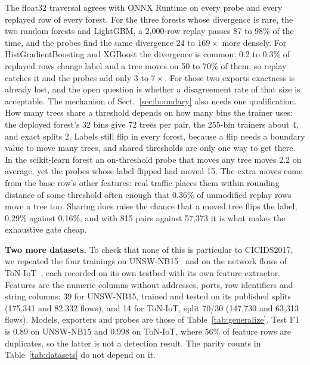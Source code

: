 \documentclass[runningheads]{llncs}
\begin{document}
The float32 traversal agrees with ONNX Runtime on every probe and every replayed row of every forest. For the three forests whose divergence is rare, the two random forests and LightGBM, a 2{,}000-row replay passes 87 to 98\% of the time, and the probes find the same divergence 24 to $169\times$ more densely. For HistGradientBoosting and XGBoost the divergence is common: 0.2 to 0.3\% of replayed rows change label and a tree moves on 50 to 70\% of them, so replay catches it and the probes add only 3 to $7\times$. For those two exports exactness is already lost, and the open question is whether a disagreement rate of that size is acceptable. The mechanism of Sect.~\ref{sec:boundary} also needs one qualification. How many trees share a threshold depends on how many bins the trainer uses: the deployed forest's 32 bins give 72 trees per pair, the 255-bin trainers about 4, and exact splits 2. Labels still flip in every forest, because a flip needs a boundary value to move many trees, and shared thresholds are only one way to get there. In the scikit-learn forest an on-threshold probe that moves any tree moves 2.2 on average, yet the probes whose label flipped had moved 15. The extra moves come from the base row's other features: real traffic places them within rounding distance of some threshold often enough that 0.36\% of unmodified replay rows move a tree too. Sharing does raise the chance that a moved tree flips the label, 0.29\% against 0.16\%, and with 815 pairs against 57{,}373 it is what makes the exhaustive gate cheap.

\textbf{Two more datasets.} To check that none of this is particular to CICIDS2017, we repeated the four trainings on UNSW-NB15~\cite{moustafa2015unsw} and on the network flows of ToN-IoT~\cite{moustafa2021toniot}, each recorded on its own testbed with its own feature extractor. Features are the numeric columns without addresses, ports, row identifiers and string columns: 39 for UNSW-NB15, trained and tested on its published splits (175{,}341 and 82{,}332 flows), and 14 for ToN-IoT, split 70/30 (147{,}730 and 63{,}313 flows). Models, exporters and probes are those of Table~\ref{tab:generalize}. Test F1 is 0.89 on UNSW-NB15 and 0.998 on ToN-IoT, where 56\% of feature rows are duplicates, so the latter is not a detection result. The parity counts in Table~\ref{tab:datasets} do not depend on it.
\end{document}

